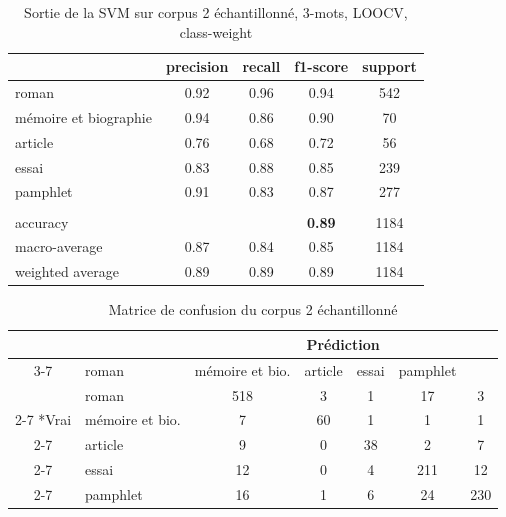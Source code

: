 \begin{table}[H]
    \centering 
    \begin{tabular}{l c c c c}
        \toprule
             & precision & recall & f1-score & support \\
        \toprule
        \midrule
        roman & 0.92 & 0.96 & 0.94 & 542 \\
        \midrule
        mémoire et biographie & 0.94 & 0.86 & 0.90 & 70\\
        \midrule
        article & 0.76 & 0.68 & 0.72 & 56\\
        \midrule
        essai & 0.83 & 0.88 & 0.85 & 239\\
        \midrule
        pamphlet & 0.91 & 0.83 & 0.87 & 277\\
        & & & & \\
        \midrule
        accuracy & & & \textbf{0.89} & 1184 \\
        \midrule
        macro-average & 0.87 & 0.84 & 0.85 & 1184\\
        \midrule
        weighted average & 0.89 & 0.89 & 0.89 & 1184\\

        \bottomrule
    \end{tabular}
\caption{Sortie de la SVM sur corpus 2 échantillonné, 3-mots, LOOCV, class-weight}
\label{'tab:SVMcorpus2'}
\end{table} 

\begin{table}[H]
    \centering 
    \begin{tabular}{|c|l|c|c|c|c|c|}
        \hline
        \multicolumn{2}{|c|}{} & \multicolumn{5}{c|}{Prédiction} \\
        \cline{3-7}
        \multicolumn{2}{|c|}{} & roman & mémoire et bio. & article & essai & pamphlet \\
        \hline
        & roman & 518 & 3 & 1 & 17 & 3 \\
        \cline{2-7}
        \multirow{3}*{Vrai} & mémoire et bio. & 7 & 60 & 1 & 1 & 1 \\
        \cline{2-7}
        & article & 9 & 0 & 38 & 2 & 7 \\
        \cline{2-7}
        & essai & 12 & 0 & 4 & 211 & 12 \\
        \cline{2-7}
        & pamphlet & 16 & 1 & 6 & 24 & 230 \\
        \hline
    \end{tabular}
    \caption{Matrice de confusion du corpus 2 échantillonné}
    \label{'tab:matriceconfusioncorpus2'}
\end{table}

